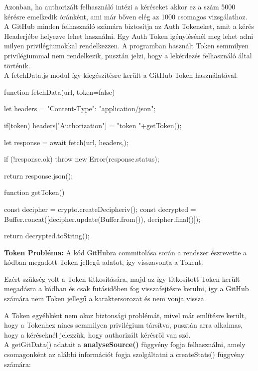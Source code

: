 Azonban, ha authorizált felhasználó intézi a kéréseket akkor ez a szám 5000 kérésre emelkedik óránként, ami már bőven elég az 1000 csomagos vizsgálathoz.\\

A GitHub minden felhasználó számára biztosítja az Auth Tokeneket, amit a kérés Headerjébe helyezve lehet használni. Egy Auth Token igénylésénél meg lehet adni milyen privilégiumokkal rendelkezzen. A programban használt Token semmilyen privilégiummal nem rendelkezik, pusztán jelzi, hogy a lekérdezés felhasználó által történik.\\

A fetchData.js modul így kiegészítésre került a GitHub Token használatával.

\pagebreak

\begin{js}
function fetchData(url, token=false){
	let headers = {"Content-Type": "application/json"};
	
	if(token){
		headers["Authorization"] = "token "+getToken();
	}
	
	let response = await fetch(url, {headers,});
	
	if (!response.ok) {
		throw new Error(response.status);
	}
	
	return response.json();
}

function getToken(){
	const decipher = crypto.createDecipheriv();
	const decrypted = Buffer.concat([decipher.update(Buffer.from()),
						decipher.final()]);
	
	return decrypted.toString();
}
\end{js}
\textbf{Token Probléma:} A kód GitHubra commitolása során a rendszer észrevette a kódban megadott Token jellegű adatot, így visszavonta a Tokent. 

Ezért szükség volt a Token titkosítására, majd az így titkosított Token került megadásra a kódban és csak futásidőben fog visszafejtésre kerülni, így a GitHub számára nem Token jellegű a karaktersorozat és nem vonja vissza.

A Token egyébként nem okoz biztonsági problémát, mivel már említésre került, hogy a Tokenhez nincs semmilyen privilégium társítva, pusztán arra alkalmas, hogy a kéréseknél jelezzük, hogy authorizált kérésről van szó.\\

A getGitData() adatait a \textbf{analyseSource()} függvény fogja felhasználni, amely csomagonként az alábbi információt fogja szolgáltatni a createStats() függvény számára:

